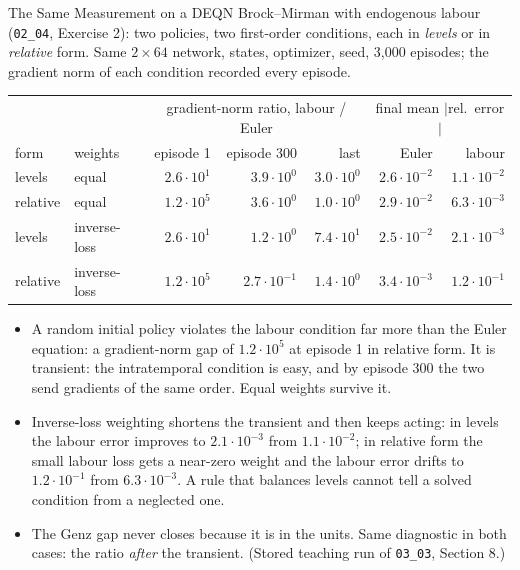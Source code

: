 \documentclass[aspectratio=169,11pt]{beamer}
\newcommand{\emphc}[1]{\textcolor{harvardcrimson}{#1}}
\begin{document}
\begin{frame}{The Same Measurement on a DEQN}
\footnotesize
Brock--Mirman with endogenous labour (\texttt{02\_04}, Exercise 2): two policies, two first-order
conditions, each in \emph{levels} or in \emph{relative} form. Same $2\times64$ network, states,
optimizer, seed, 3{,}000 episodes; the gradient norm of each condition recorded every episode.

\vspace{-0.05cm}
\begin{center}
\renewcommand{\arraystretch}{0.95}
{\scriptsize
\begin{tabular}{@{}ll rrr rr@{}}
\toprule
 & & \multicolumn{3}{c}{gradient-norm ratio, labour / Euler} & \multicolumn{2}{c}{final mean $|$rel.\ error$|$} \\
form & weights & episode 1 & episode 300 & last & Euler & labour \\
\midrule
levels   & equal        & $2.6\cdot10^{1}$ & $3.9\cdot10^{0}$ & $3.0\cdot10^{0}$ & $2.6\cdot10^{-2}$ & $1.1\cdot10^{-2}$ \\
relative & equal        & $1.2\cdot10^{5}$ & $3.6\cdot10^{0}$ & $1.0\cdot10^{0}$ & $2.9\cdot10^{-2}$ & $6.3\cdot10^{-3}$ \\
levels   & inverse-loss & $2.6\cdot10^{1}$ & $1.2\cdot10^{0}$ & $7.4\cdot10^{1}$ & $2.5\cdot10^{-2}$ & $2.1\cdot10^{-3}$ \\
relative & inverse-loss & $1.2\cdot10^{5}$ & $2.7\cdot10^{-1}$ & $1.4\cdot10^{0}$ & $3.4\cdot10^{-3}$ & $1.2\cdot10^{-1}$ \\
\bottomrule
\end{tabular}}
\end{center}

\vspace{0.1cm}
\begin{itemize}\itemsep0pt\scriptsize
  \item A random initial policy violates the labour condition far more than the Euler equation: a gradient-norm gap of $1.2\cdot10^{5}$ at episode 1 in relative form. It is \emphc{transient}: the intratemporal condition is easy, and by episode 300 the two send gradients of the same order. Equal weights survive it.
  \item Inverse-loss weighting shortens the transient and then keeps acting: in levels the labour error improves to $2.1\cdot10^{-3}$ from $1.1\cdot10^{-2}$; in relative form the small labour loss gets a near-zero weight and the labour error drifts to $1.2\cdot10^{-1}$ from $6.3\cdot10^{-3}$. A rule that balances levels cannot tell a solved condition from a neglected one.
  \item The Genz gap never closes because it is in the units. Same diagnostic in both cases: the ratio \emph{after} the transient. {\scriptsize (Stored teaching run of \texttt{03\_03}, Section 8.)}
\end{itemize}
\end{frame}
\end{document}
